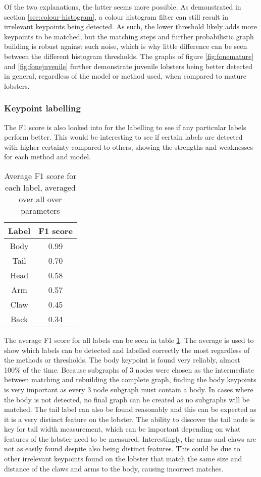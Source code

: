 Of the two explanations, the latter seems more possible. As demonstrated in section \ref{sec:colour-histogram}, a colour histogram filter can still result in irrelevant keypoints being detected. As such, the lower threshold likely adds more keypoints to be matched, but the matching steps and further probabilistic graph building is robust against such noise, which is why little difference can be seen between the different histogram thresholds. 
\n
The graphs of figure \ref{fig:fonemature} and \ref{fig:fonejuvenile} further demonstrate juvenile lobsters being better detected in general, regardless of the model or method used, when compared to mature lobsters. 
\subsubsection{Keypoint labelling}
The F1 score is also looked into for the labelling to see if any particular labels perform better. This would be interesting to see if certain labels are detected with higher certainty compared to others, showing the strengths and weaknesses for each method and model.

\begin{table}[H]
\centering
\begin{tabular}{| c | c |}
\hline
\textbf{Label} & \textbf{F1 score} \\
\hline
Body & 0.99 \\
Tail & 0.70 \\
Head & 0.58 \\
Arm & 0.57 \\
Claw & 0.45 \\
Back & 0.34 \\
\hline
\end{tabular}
\caption{Average F1 score for each label, averaged over all over parameters}
\label{tbl:avg-allf1}
\end{table}
\noindent
The average F1 score for all labels can be seen in table \ref{tbl:avg-allf1}. The average is used to show which labels can be detected and labelled correctly the most regardless of the methods or thresholds. The body keypoint is found very reliably, almost 100\% of the time. Because subgraphs of 3 nodes were chosen as the intermediate between matching and rebuilding the complete graph, finding the body keypoints is very important as every 3 node subgraph must contain a body. In cases where the body is not detected, no final graph can be created as no subgraphs will be matched.
\n
The tail label can also be found reasonably and this can be expected as it is a very distinct feature on the lobster. The ability to discover the tail node is key for tail width measurement, which can be important depending on what features of the lobster need to be measured. Interestingly, the arms and claws are not as easily found despite also being distinct features. This could be due to other irrelevant keypoints found on the lobster that match the same size and distance of the claws and arms to the body, causing incorrect matches. 

